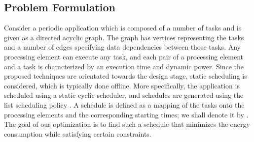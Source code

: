 \subsection{Problem Formulation}

Consider a periodic application which is composed of a number of tasks and is
given as a directed acyclic graph. The graph has \nt vertices representing the
tasks and a number of edges specifying data dependencies between those tasks.
Any processing element can execute any task, and each pair of a processing
element and a task is characterized by an execution time and dynamic power.
Since the proposed techniques are orientated towards the design stage, static
scheduling is considered, which is typically done offline. More specifically,
the application is scheduled using a static cyclic scheduler, and schedules are
generated using the list scheduling policy \cite{adam1974}. A schedule is
defined as a mapping of the tasks onto the processing elements and the
corresponding starting times; we shall denote it by \schedule. The goal of our
optimization is to find such a schedule \schedule that minimizes the energy
consumption while satisfying certain constraints.

